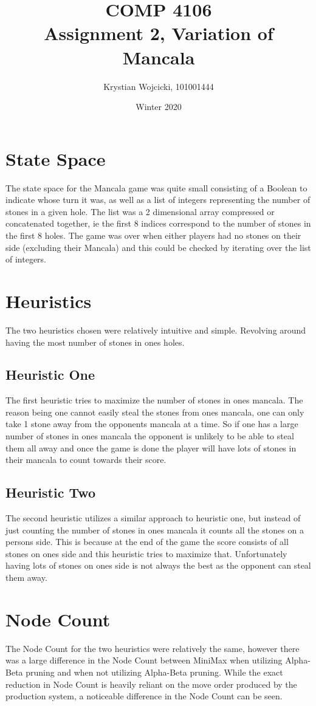 \documentclass{article}
\title{COMP 4106\\
	\large{Assignment 2, Variation of Mancala}}
\author{Krystian Wojcicki, 101001444}
\date{Winter 2020}
\begin{document}
\maketitle

\section{State Space}
The state space for the Mancala game was quite small consisting of a Boolean to indicate whose turn it was, as well as a list of integers representing the number of stones in a given hole. The list was a 2 dimensional array compressed or concatenated together, ie the first 8 indices correspond to the number of stones in the first 8 holes.  The game was over when either players had no stones on their side (excluding their Mancala) and this could be checked by iterating over the list of integers.

\section{Heuristics}

The two heuristics chosen were relatively intuitive and simple. Revolving around having the most number of stones in ones holes.

\subsection{Heuristic One}

The first heuristic tries to maximize the number of stones in ones mancala. The reason being one cannot easily steal the stones from ones mancala, one can only take 1 stone away from the opponents mancala at a time. So if one has a large number of stones in ones mancala the opponent is unlikely to be able to steal them all away and once the game is done the player will have lots of stones in their mancala to count towards their score.

\subsection{Heuristic Two}

The second heuristic utilizes a similar approach to heuristic one, but instead of just counting the number of stones in ones mancala it counts all the stones on a persons side. This is because at the end of the game the score consists of all stones on ones side and this heuristic tries to maximize that. Unfortunately having lots of stones on ones side is not always the best as the opponent can steal them away.

\section{Node Count}
The Node Count for the two heuristics were relatively the same, however there was a large difference in the Node Count between MiniMax when utilizing Alpha-Beta pruning and when not utilizing Alpha-Beta pruning. While the exact reduction in Node Count is heavily reliant on the move order produced by the production system, a noticeable difference in the Node Count can be seen.
\end{document}
